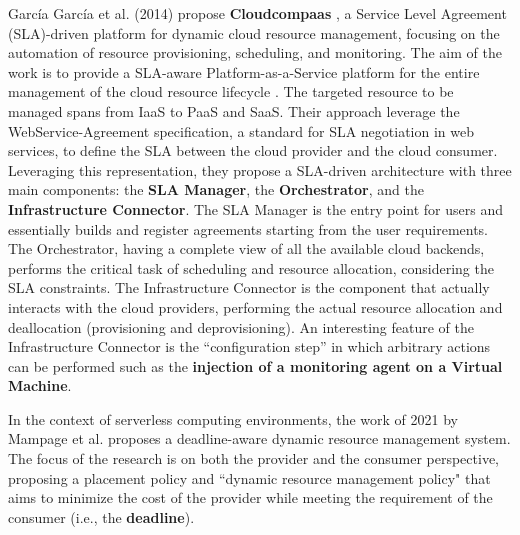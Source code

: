 García García et al. (2014) propose \textbf{Cloudcompaas} \cite{GARCIAGARCIA20141}, a Service Level Agreement (SLA)-driven platform for dynamic cloud resource management, focusing on the automation of resource provisioning, scheduling, and monitoring.
The aim of the work is to provide a SLA-aware Platform-as-a-Service platform for the entire management of the cloud resource lifecycle \cite{GARCIAGARCIA20141}.
The targeted resource to be managed spans from IaaS to PaaS and SaaS.
Their approach leverage the WebService-Agreement specification, a standard for SLA negotiation in web services, to define the SLA between the cloud provider and the cloud consumer.
Leveraging this representation, they propose a SLA-driven architecture with three main components: the \textbf{SLA Manager}, the \textbf{Orchestrator}, and the \textbf{Infrastructure Connector}.
The SLA Manager is the entry point for users and essentially builds and register agreements starting from the user requirements.
The Orchestrator, having a complete view of all the available cloud backends, performs the critical task of scheduling and resource allocation, considering the SLA constraints.
The Infrastructure Connector is the component that actually interacts with the cloud providers, performing the actual resource allocation and deallocation (provisioning and deprovisioning).
An interesting feature of the Infrastructure Connector is the ``configuration step'' in which arbitrary actions can be performed such as the \textbf{injection of a monitoring agent on a Virtual Machine}.
\newline

In the context of serverless computing environments, the work of 2021 by Mampage et al. \cite{9499407} proposes a deadline-aware dynamic resource management system.
The focus of the research is on both the provider and the consumer perspective, proposing a placement policy and ``dynamic resource management policy" that aims to minimize the cost of the provider while meeting the requirement of the consumer (i.e., the \textbf{deadline}).
\newline





